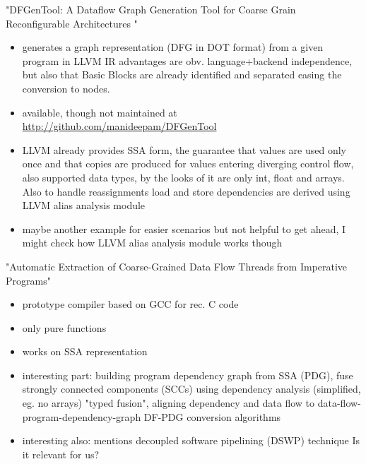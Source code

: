 "DFGenTool: A Dataflow Graph Generation Tool for Coarse Grain Reconfigurable Architectures "~\cite{mukherjee2017dfgentool}
\begin{itemize}
    \item generates a graph representation (DFG in DOT format) from a given program in LLVM IR \means advantages are obv. language+backend independence, but also that Basic Blocks are already identified and separated easing the conversion to nodes.
    \item available, though not maintained at \url{http://github.com/manideepam/DFGenTool}
    \item LLVM already provides SSA form, the guarantee that values are used only once and that copies are produced for values entering diverging control flow, also supported data types, by the looks of it are only int, float and arrays. Also to handle reassignments load and store dependencies are derived using LLVM alias analysis module
    \item \means maybe another example for easier scenarios but not helpful to get ahead, I might check how LLVM alias analysis module works though
\end{itemize}

"Automatic Extraction of Coarse-Grained Data Flow Threads from Imperative Programs" 
\begin{itemize}
    \item prototype compiler based on GCC for rec. C code
    \item only pure functions
    \item works on SSA representation
    \item interesting part: building program dependency graph from SSA (PDG), fuse strongly connected components (SCCs) using dependency analysis (simplified, eg. no arrays) \means "typed fusion", aligning dependency and data flow to data-flow-program-dependency-graph DF-PDG \means conversion algorithms     
    \item interesting also: mentions decoupled software pipelining (DSWP) technique \means Is it relevant for us?
\end{itemize}

